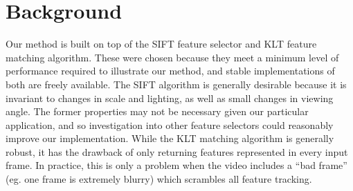 \section{Background}
\label{sec:background}

Our method is built on top of the SIFT \cite{sift} feature selector and KLT
\cite{kltImpl,klt} feature matching algorithm.  These were chosen because
they meet a minimum level of performance required to illustrate our method, and
stable implementations of both are freely available.  The SIFT algorithm is
generally desirable because it is invariant to changes in scale and lighting,
as well as small changes in viewing angle.  The former properties may not be
necessary given our particular application, and so investigation into other
feature selectors could reasonably improve our implementation.  While the KLT
matching algorithm is generally robust, it has the drawback of only returning
features represented in every input frame.  In practice, this is only a problem
when the video includes a ``bad frame'' (eg. one frame is extremely blurry)
which scrambles all feature tracking.

